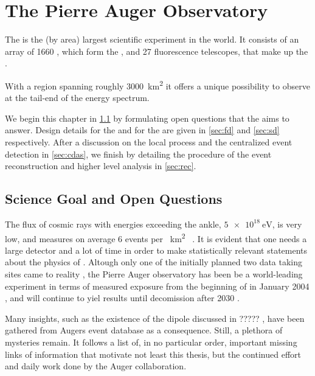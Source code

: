 
\chapter{The Pierre Auger Observatory}
\label{chap:pierre-auger-observatory}

The \PAO is the (by area) largest scientific experiment in the world. It 
consists of an array of 1660 \WCDs, which form the \SD, and 27 fluorescence 
telescopes, that make up the \FD.

With a region spanning roughly \SI{3000}{\kilo\meter\squared} it offers a unique
possibility to observe \UHECRs at the tail-end of the \CR energy spectrum. 

We begin this chapter in \cref{sec:science-case} by formulating open questions 
that the \PAO aims to answer. Design details for the \FD and for the \SD are 
given in \cref{sec:fd} and \cref{sec:sd} respectively. After a discussion on the
local \DAQ process and the centralized event detection in \cref{sec:cdas}, we 
finish by detailing the procedure of the event reconstruction and higher level 
analysis in \cref{sec:rec}.

\section{Science Goal and Open Questions}
\label{sec:science-case}

The flux of cosmic rays with energies exceeding the ankle, $\SI{5e18}{\eV}$, is 
very low, and measures on average 6 events per \SI{}{\km\squared\year}
\cite{Fenu2023}. It is evident that one needs a large detector and a lot of time
in order to make statistically relevant statements about the physics of \UHECRs.
Altough only one of the initially planned two data taking sites came to reality 
\cite[for white paper see][]{Zavrtanik2000}, the Pierre Auger observatory has 
been be a world-leading experiment in terms of measured exposure from the 
beginning of \DAQ in January 2004 \cite{Abraham2004}, and will continue to yiel
results until decomission after 2030 \cite{Castellina2023}.

Many insights, such as the existence of the \CR dipole discussed in ?????
, 
have been gathered from Augers event database as a consequence.
Still, a plethora of mysteries remain. It follows a list of, in no particular
order, important missing links of information that motivate not least this
thesis, but the continued effort and daily work done by the Auger collaboration.

